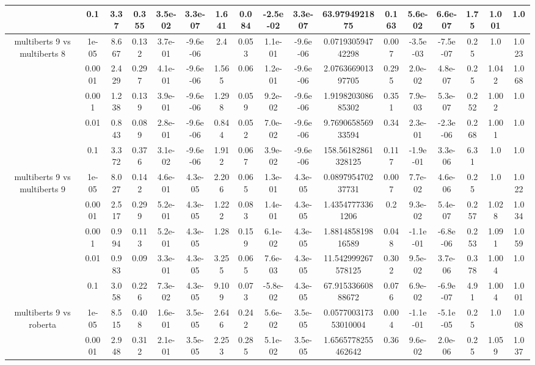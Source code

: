 \begin{tabular}{|c|c|c|c|c|c|c|c|c|c|c|c|c|c|c|c|c|}
 & 0.1 & 3.37 & 0.355 & 3.5e-02 & 3.3e-07 & 1.641 & 0.084 & -2.5e-02 & 3.3e-07 & 63.9794921875 & 0.163 & 5.6e-02 & 6.6e-07 & 1.75 & 1.001 & 1.0 \\
\hline
\multirow{5}{*}{multiberts 9 vs multiberts 8} & 1e-05 & 8.667 & 0.132 & 3.7e-01 & -9.6e-06 & 2.4 & 0.053 & 1.1e-01 & -9.6e-06 & 0.071930594742298 & 0.007 & -3.5e-03 & -7.5e-07 & 0.25 & 1.0 & 1.023 \\
 & 0.0001 & 2.429 & 0.297 & 4.1e-01 & -9.6e-06 & 1.565 & 0.06 & 1.2e-01 & -9.6e-06 & 2.076366901397705 & 0.295 & 2.0e-02 & 4.8e-07 & 0.25 & 1.042 & 1.068 \\
 & 0.001 & 1.238 & 0.139 & 3.9e-01 & -9.6e-06 & 1.298 & 0.059 & 9.2e-02 & -9.6e-06 & 1.919820308685302 & 0.351 & 7.9e-03 & 5.3e-07 & 0.252 & 1.002 & 1.0 \\
 & 0.01 & 0.843 & 0.089 & 2.8e-01 & -9.6e-06 & 0.844 & 0.052 & 7.0e-02 & -9.6e-06 & 9.769065856933594 & 0.34 & 2.3e-01 & -2.3e-06 & 0.268 & 1.001 & 1.0 \\
 & 0.1 & 3.372 & 0.376 & 3.1e-02 & -9.6e-06 & 1.912 & 0.067 & 3.9e-02 & -9.6e-06 & 158.56182861328125 & 0.117 & -1.9e-01 & 3.3e-06 & 6.31 & 1.0 & 1.0 \\
\hline
\multirow{5}{*}{multiberts 9 vs multiberts 9} & 1e-05 & 8.027 & 0.142 & 4.6e-01 & 4.3e-05 & 2.206 & 0.065 & 1.3e-01 & 4.3e-05 & 0.089795470237731 & 0.007 & 7.7e-02 & 4.6e-06 & 0.25 & 1.0 & 1.022 \\
 & 0.0001 & 2.517 & 0.299 & 5.2e-01 & 4.3e-05 & 1.222 & 0.083 & 1.4e-01 & 4.3e-05 & 1.43547773361206 & 0.2 & 9.3e-02 & 5.4e-07 & 0.257 & 1.028 & 1.034 \\
 & 0.001 & 0.994 & 0.113 & 5.2e-01 & 4.3e-05 & 1.28 & 0.159 & 6.1e-02 & 4.3e-05 & 1.881485819816589 & 0.048 & -1.1e-01 & -6.8e-06 & 0.253 & 1.091 & 1.059 \\
 & 0.01 & 0.983 & 0.09 & 3.3e-01 & 4.3e-05 & 3.255 & 0.065 & 7.6e-03 & 4.3e-05 & 11.542999267578125 & 0.302 & 9.5e-02 & 3.7e-06 & 0.378 & 1.004 & 1.0 \\
 & 0.1 & 3.058 & 0.226 & 7.3e-02 & 4.3e-05 & 9.109 & 0.073 & -5.8e-02 & 4.3e-05 & 67.91533660888672 & 0.076 & 6.9e-02 & -6.9e-07 & 4.91 & 1.004 & 1.001 \\
\hline
\multirow{5}{*}{multiberts 9 vs roberta } & 1e-05 & 8.515 & 0.408 & 1.6e-01 & 3.5e-05 & 2.646 & 0.242 & 5.6e-02 & 3.5e-05 & 0.057700317353010004 & 0.004 & -1.1e-01 & -5.1e-05 & 0.25 & 1.0 & 1.008 \\
 & 0.0001 & 2.948 & 0.312 & 2.1e-01 & 3.5e-05 & 2.253 & 0.285 & 5.1e-02 & 3.5e-05 & 1.6565778255462642 & 0.36 & 9.6e-02 & 2.0e-06 & 0.25 & 1.059 & 1.037 \\

\end{tabular}
